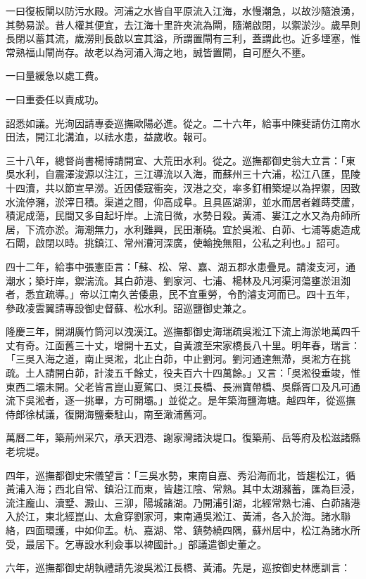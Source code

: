 一曰復板閘以防污水殿。河浦之水皆自平原流入江海，水慢潮急，以故沙隨浪湧，其勢易淤。昔人權其便宜，去江海十里許夾流為閘，隨潮啟閉，以禦淤沙。歲旱則長閉以蓄其流，歲澇則長啟以宣其溢，所謂置閘有三利，蓋謂此也。近多堙塞，惟常熟福山閘尚存。故老以為河浦入海之地，誠皆置閘，自可歷久不壅。

一曰量緩急以處工費。

一曰重委任以責成功。

詔悉如議。光洵因請專委巡撫歐陽必進。從之。二十六年，給事中陳斐請仿江南水田法，開江北溝洫，以祛水患，益歲收。報可。

三十八年，總督尚書楊博請開宣、大荒田水利。從之。巡撫都御史翁大立言：「東吳水利，自震澤浚源以注江，三江導流以入海，而蘇州三十六浦，松江八匯，毘陵十四瀆，共以節宣旱澇。近因倭寇衝突，汊港之交，率多釘柵築堤以為捍禦，因致水流停瀦，淤滓日積。渠道之間，仰高成阜。且具區湖泖，並水而居者雜蒔茭蘆，積泥成蕩，民間又多自起圩岸。上流日微，水勢日殺。黃浦、婁江之水又為舟師所居，下流亦淤。海潮無力，水利難興，民田漸磽。宜於吳淞、白茆、七浦等處造成石閘，啟閉以時。挑鎮江、常州漕河深廣，使輸挽無阻，公私之利也。」詔可。

四十二年，給事中張憲臣言：「蘇、松、常、嘉、湖五郡水患疊見。請浚支河，通潮水；築圩岸，禦湍流。其白茆港、劉家河、七浦、楊林及凡河渠河蕩壅淤沮洳者，悉宜疏導。」帝以江南久苦倭患，民不宜重勞，令酌濬支河而已。四十五年，參政凌雲翼請專設御史督蘇、松水利。詔巡鹽御史兼之。

隆慶三年，開湖廣竹筒河以洩漢江。巡撫都御史海瑞疏吳淞江下流上海淤地萬四千丈有奇。江面舊三十丈，增開十五丈，自黃渡至宋家橋長八十里。明年春，瑞言：「三吳入海之道，南止吳淞，北止白茆，中止劉河。劉河通達無滯，吳淞方在挑疏。土人請開白茆，計浚五千餘丈，役夫百六十四萬餘。」又言：「吳淞役垂竣，惟東西二壩未開。父老皆言崑山夏駕口、吳江長橋、長洲寶帶橋、吳縣胥口及凡可通流下吳淞者，逐一挑畢，方可開壩。」並從之。是年築海鹽海塘。越四年，從巡撫侍郎徐栻議，復開海鹽秦駐山，南至澉浦舊河。

萬曆二年，築荊州采穴，承天泗港、謝家灣諸決堤口。復築荊、岳等府及松滋諸縣老垸堤。

四年，巡撫都御史宋儀望言：「三吳水勢，東南自嘉、秀沿海而北，皆趨松江，循黃浦入海；西北自常、鎮沿江而東，皆趨江陰、常熟。其中太湖瀦蓄，匯為巨浸，流注龐山、瀆墅、澱山、三泖，陽城諸湖。乃開浦引湖，北經常熟七浦、白茆諸港入於江，東北經崑山、太倉穿劉家河，東南通吳淞江、黃浦，各入於海。諸水聯絡，四面環護，中如仰盂。杭、嘉湖、常、鎮勢繞四隅，蘇州居中，松江為諸水所受，最居下。乞專設水利僉事以裨國計。」部議遣御史董之。

六年，巡撫都御史胡執禮請先浚吳淞江長橋、黃浦。先是，巡按御史林應訓言：


